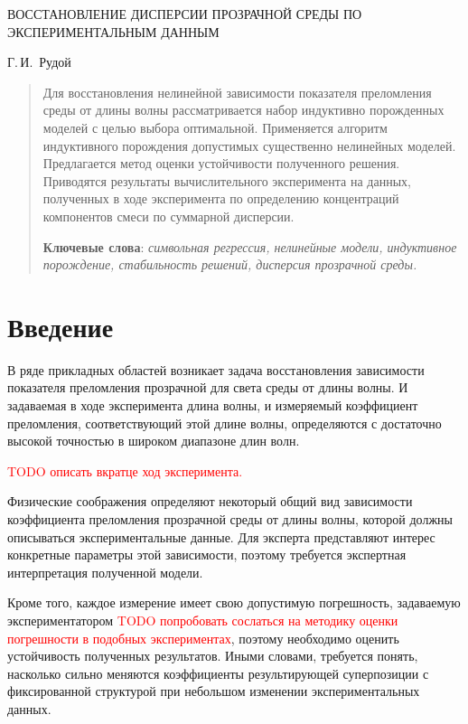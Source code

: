 \documentclass[12pt,a4paper]{article}
\begin{document}
\lstset{language=C++}

\begin{center}
  ВОССТАНОВЛЕНИЕ ДИСПЕРСИИ ПРОЗРАЧНОЙ СРЕДЫ ПО ЭКСПЕРИМЕНТАЛЬНЫМ ДАННЫМ

  \bigskip
  Г.\,И.~Рудой
\end{center}

\begin{abstract}
  Для восстановления нелинейной зависимости показателя преломления среды от длины
  волны рассматривается набор индуктивно порожденных моделей с целью выбора оптимальной.
  Применяется алгоритм индуктивного порождения допустимых существенно
  нелинейных моделей. Предлагается метод оценки устойчивости полученного решения.
  Приводятся результаты вычислительного эксперимента на данных, полученных в ходе
  эксперимента по определению концентраций компонентов смеси по суммарной дисперсии.

  \bigskip
  \textbf{Ключевые слова}: \emph{символьная регрессия, нелинейные модели, индуктивное порождение,
	стабильность решений, дисперсия прозрачной среды.}
\end{abstract}

\section*{Введение}

В ряде прикладных областей возникает задача восстановления зависимости показателя
преломления прозрачной для света среды от длины волны. И задаваемая в ходе эксперимента
длина волны, и измеряемый коэффициент преломления, соответствующий этой длине волны,
определяются с достаточно высокой точностью в широком диапазоне длин волн.

\textcolor{red}{TODO описать вкратце ход эксперимента.}

Физические соображения \cite{Sivukhin05,Serova11} определяют некоторый общий вид
зависимости коэффициента преломления прозрачной среды от длины волны, которой должны
описываться экспериментальные данные. Для эксперта представляют интерес конкретные
параметры этой зависимости, поэтому требуется экспертная интерпретация полученной
модели.

Кроме того, каждое измерение имеет свою допустимую погрешность, задаваемую
экспериментатором \textcolor{red}{TODO попробовать сослаться на методику оценки погрешности в подобных экспериментах}, поэтому необходимо оценить устойчивость полученных результатов.
Иными словами, требуется понять, насколько сильно меняются коэффициенты
результирующей суперпозиции с фиксированной структурой
при небольшом изменении экспериментальных данных.
\end{document}
